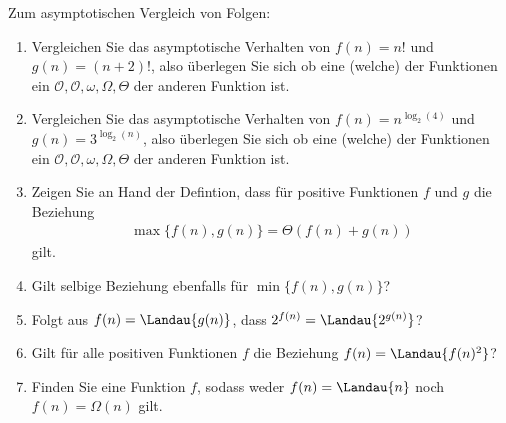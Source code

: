 
\begin{exercise}

Zum asymptotischen Vergleich von Folgen:
\begin{enumerate}[label = (\alph*)]
  \item Vergleichen Sie das asymptotische Verhalten von $f(n) = n!$ und $g(n) = (n + 2)!$,
  also überlegen Sie sich ob eine (welche) der Funktionen ein ${\scriptstyle \mathcal{O}}, \mathcal{O}, \omega, \Omega, \Theta$
  der anderen Funktion ist.
  \item Vergleichen Sie das asymptotische Verhalten von $f(n) = n^{\log_2(4)}$ und
  $g(n) = 3^{\log_2(n)}$, also überlegen Sie sich ob eine (welche) der Funktionen
  ein ${\scriptstyle \mathcal{O}}, \mathcal{O}, \omega, \Omega, \Theta$ der anderen Funktion ist.
  \item Zeigen Sie an Hand der Defintion, dass für positive Funktionen $f$ und $g$
  die Beziehung
  \begin{align*}
    \max\{f(n),g(n)\} = \Theta(f(n) + g(n))
  \end{align*}
  gilt.
  \item Gilt selbige Beziehung ebenfalls für $\min\{f(n),g(n)\}$?
  \item Folgt aus $f(n) = \Landau{g(n)}$, dass $2^{f(n)} = \Landau{2^{g(n)}}$?
  \item Gilt für alle positiven Funktionen $f$ die Beziehung $f(n) = \Landau{f(n)^2}$?
  \item Finden Sie eine Funktion $f$, sodass weder $f(n) = \Landau{n}$ noch $f(n) = \Omega(n)$ gilt.
\end{enumerate}

\end{exercise}


